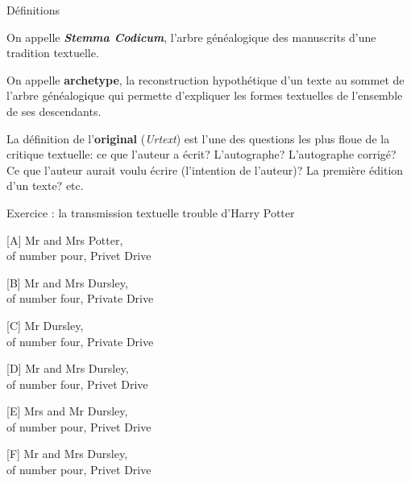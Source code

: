 \documentclass[11pt]{beamer}
\begin{document}
\begin{frame}{Définitions}
    \begin{definition}
        On appelle \textbf{\textit{Stemma Codicum}}, l'arbre généalogique des manuscrits d'une tradition textuelle.
    \end{definition}
    \pause
    \begin{definition}
        On appelle \textbf{archetype}, la reconstruction hypothétique d'un texte au sommet de l'arbre généalogique qui permette d'expliquer les formes textuelles de l'ensemble de ses descendants.
    \end{definition}
    \pause
    \begin{definition}
        La définition de l'\textbf{original} (\textit{Urtext}) est l'une des questions les plus floue de la critique textuelle: ce que l'auteur a écrit? L'autographe? L'autographe corrigé? Ce que l'auteur aurait voulu écrire (l'intention de l'auteur)? La première édition d'un texte? etc.
    \end{definition}
\end{frame}


\begin{frame}{Exercice : la transmission textuelle trouble d'Harry Potter}
    \begin{minipage}{.45\textwidth}
        \begin{block}{}
            [A] Mr and Mrs {Potter},\\ of number {pour}, Privet Drive
        \end{block}
        \begin{block}{}
            [B] Mr and Mrs Dursley,\\ of number four, Private Drive
        \end{block}
        \begin{block}{}
            [C] {Mr Dursley},\\ of number four, {Private} Drive
        \end{block}

    \end{minipage}
    \hfill
    \begin{minipage}{.45\textwidth}
         \begin{block}{}
            [D] Mr and Mrs Dursley,\\ of number four, Privet Drive 
        \end{block}
        \begin{block}{}
            [E] {Mrs and Mr} Dursley,\\ of number {pour}, Privet Drive
        \end{block}
        \begin{block}{}
            [F] Mr and Mrs Dursley,\\ of number pour, Privet Drive
        \end{block}     
    \end{minipage}
\end{frame}
\end{document}
